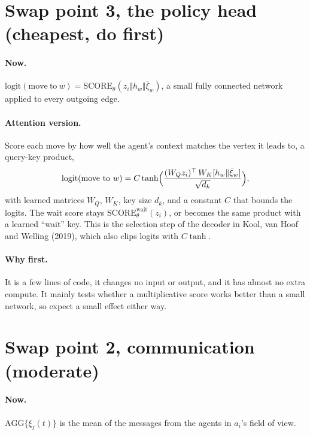 \documentclass[11pt,a4paper]{article}
\begin{document}
\section{Swap point 3, the policy head (cheapest, do first)}

\paragraph{Now.} $\mathrm{logit}(\mathrm{move\ to\ } w) = \mathrm{SCORE}_\theta(z_i \Vert h_w \Vert \bar\xi_w)$,
a small fully connected network applied to every outgoing edge.

\paragraph{Attention version.} Score each move by how well the agent's
context matches the vertex it leads to, a query-key product,
\[
  \mathrm{logit}(\mathrm{move\ to\ } w) =
  C \tanh\Bigl( \frac{(W_Q z_i)^\top \, W_K [h_w \Vert \bar\xi_w]}{\sqrt{d_k}} \Bigr),
\]
with learned matrices $W_Q$, $W_K$, key size $d_k$, and a constant $C$
that bounds the logits. The wait score stays $\mathrm{SCORE}^{\mathrm{wait}}_\theta(z_i)$,
or becomes the same product with a learned ``wait'' key. This is the
selection step of the decoder in Kool, van Hoof and Welling (2019), which
also clips logits with $C\tanh$.

\paragraph{Why first.} It is a few lines of code, it changes no input or
output, and it has almost no extra compute. It mainly tests whether a
multiplicative score works better than a small network, so expect a small
effect either way.

\section{Swap point 2, communication (moderate)}

\paragraph{Now.} $\mathrm{AGG}\{\xi_j(t)\}$ is the mean of the messages
from the agents in $a_i$'s field of view.
\end{document}
